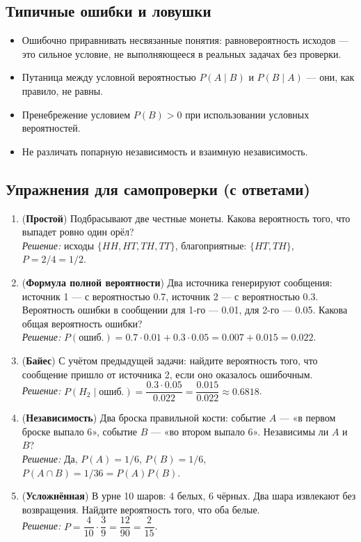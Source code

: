 \subsection{Типичные ошибки и ловушки}
\begin{itemize}
  \item Ошибочно приравнивать несвязанные понятия: равновероятность исходов — это сильное условие, не выполняющееся в реальных задачах без проверки.
  \item Путаница между условной вероятностью $P(A\mid B)$ и $P(B\mid A)$ — они, как правило, не равны.
  \item Пренебрежение условием $P(B)>0$ при использовании условных вероятностей.
  \item Не различать попарную независимость и взаимную независимость.
\end{itemize}

\subsection{Упражнения для самопроверки (с ответами)}
\begin{enumerate}
  \item (\textbf{Простой}) Подбрасывают две честные монеты. Какова вероятность того, что выпадет ровно один орёл? \\
  \textit{Решение:} исходы $\{HH,HT,TH,TT\}$, благоприятные: $\{HT,TH\}$, $P=2/4=1/2$.

  \item (\textbf{Формула полной вероятности}) Два источника генерируют сообщения: источник 1 — с вероятностью 0.7, источник 2 — с вероятностью 0.3. Вероятность ошибки в сообщении для 1-го — 0.01, для 2-го — 0.05. Какова общая вероятность ошибки? \\
  \textit{Решение:} $P(\text{ошиб.})=0.7\cdot0.01+0.3\cdot0.05=0.007+0.015=0.022$.

  \item (\textbf{Байес}) С учётом предыдущей задачи: найдите вероятность того, что сообщение пришло от источника 2, если оно оказалось ошибочным. \\
  \textit{Решение:} $P(H_2\mid \text{ошиб.}) = \dfrac{0.3\cdot0.05}{0.022} = \dfrac{0.015}{0.022}\approx0.6818$.

  \item (\textbf{Независимость}) Два броска правильной кости: событие $A$ — «в первом броске выпало 6», событие $B$ — «во втором выпало 6». Независимы ли $A$ и $B$? \\
  \textit{Решение:} Да, $P(A)=1/6$, $P(B)=1/6$, $P(A\cap B)=1/36 = P(A)P(B)$.

  \item (\textbf{Усложнённая}) В урне 10 шаров: 4 белых, 6 чёрных. Два шара извлекают без возвращения. Найдите вероятность того, что оба белые. \\
  \textit{Решение:} $P = \dfrac{4}{10}\cdot \dfrac{3}{9} = \dfrac{12}{90} = \dfrac{2}{15}$.
\end{enumerate}

